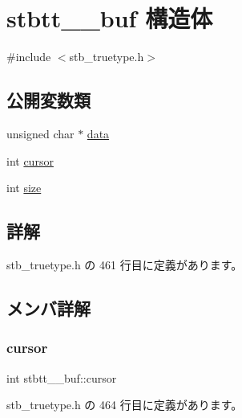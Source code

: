 \hypertarget{structstbtt____buf}{}\section{stbtt\+\_\+\+\_\+buf 構造体}
\label{structstbtt____buf}


{\ttfamily \#include $<$stb\+\_\+truetype.\+h$>$}

\subsection*{公開変数類}
\begin{DoxyCompactItemize}
\item 
unsigned char $\ast$ \mbox{\hyperlink{structstbtt____buf_a376d8cdacbc8295a7e88567ad52a0ac4}{data}}
\item 
int \mbox{\hyperlink{structstbtt____buf_ac047fda650726920531272c28aa354fb}{cursor}}
\item 
int \mbox{\hyperlink{structstbtt____buf_a0f6f2d06981ab4a5697233bbd0cafb5b}{size}}
\end{DoxyCompactItemize}


\subsection{詳解}


 stb\+\_\+truetype.\+h の 461 行目に定義があります。



\subsection{メンバ詳解}
\mbox{\label{structstbtt____buf_ac047fda650726920531272c28aa354fb}} 
\subsubsection{\texorpdfstring{cursor}{cursor}}
{\footnotesize\ttfamily int stbtt\+\_\+\+\_\+buf\+::cursor}



 stb\+\_\+truetype.\+h の 464 行目に定義があります。

\mbox{\label{structstbtt____buf_a376d8cdacbc8295a7e88567ad52a0ac4}} 
